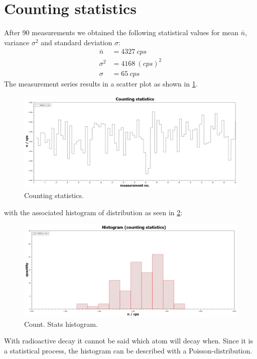 \section{Counting statistics}
%
After 90 measurements we obtained the following statistical values for mean \( \bar{n} \), variance \( \sigma^{2} \) and standard deviation
\( \sigma \):
%
\begin{align}
\bar{n}     &=  \SI{4327}{cps} \\
\sigma^{2}  &=  \SI{4168}{(cps)^{2}} \\
\sigma      &=  \SI{65}{cps}
\end{align}
The measurement series results in a scatter plot as shown in \cref{fig:countingStatistics}.
\begin{figure}[H]
 \centering
 \includegraphics[width=.8\textwidth]{scidavis/Fig.8_Counting statistics.jpg}
 \caption[Counting statistics]{Counting statistics.}
 \label{fig:countingStatistics}
\end{figure}
with the associated histogram of distribution as seen in \cref{fig:countStatsHistogram}:
\begin{figure}[H]
 \centering
 \includegraphics[width=.8\textwidth]{scidavis/Fig.9_Histogram (counting statistics).jpg}
 \caption[Count. stats histogram]{Count. Stats histogram.}
 \label{fig:countStatsHistogram}
\end{figure}
With radioactive decay it cannot be said which atom will decay when. Since it is a statistical process, the histogram
can be described with a Poisson-distribution.
%
